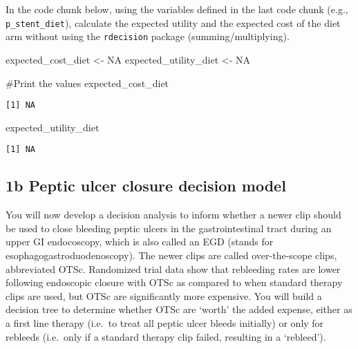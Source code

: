 \documentclass[
  letterpaper,
  DIV=11,
  numbers=noendperiod]{scrartcl}
\newenvironment{Shaded}{\begin{snugshade}}{\end{snugshade}}
\newcommand{\CommentTok}[1]{\textcolor[rgb]{0.37,0.37,0.37}{#1}}
\newcommand{\ConstantTok}[1]{\textcolor[rgb]{0.56,0.35,0.01}{#1}}
\newcommand{\NormalTok}[1]{\textcolor[rgb]{0.00,0.23,0.31}{#1}}
\newcommand{\OtherTok}[1]{\textcolor[rgb]{0.00,0.23,0.31}{#1}}
\begin{document}
In the code chunk below, using the variables defined in the last code
chunk (e.g., \texttt{p\_stent\_diet}), calculate the expected utility
and the expected cost of the diet arm without using the
\texttt{rdecision} package (summing/multiplying).

\begin{Shaded}
\begin{Highlighting}[]
\NormalTok{expected\_cost\_diet }\OtherTok{\textless{}{-}} \ConstantTok{NA}
\NormalTok{expected\_utility\_diet }\OtherTok{\textless{}{-}} \ConstantTok{NA}

\CommentTok{\#Print the values}
\NormalTok{expected\_cost\_diet}
\end{Highlighting}
\end{Shaded}

\begin{verbatim}
[1] NA
\end{verbatim}

\begin{Shaded}
\begin{Highlighting}[]
\NormalTok{expected\_utility\_diet}
\end{Highlighting}
\end{Shaded}

\begin{verbatim}
[1] NA
\end{verbatim}

\hypertarget{b-peptic-ulcer-closure-decision-model}{%
\subsection{1b Peptic ulcer closure decision
model}\label{b-peptic-ulcer-closure-decision-model}}

You will now develop a decision analysis to inform whether a newer clip
should be used to close bleeding peptic ulcers in the gastrointestinal
tract during an upper GI endocoscopy, which is also called an EGD
(stands for esophagogastroduodenoscopy). The newer clips are called
over-the-scope clips, abbreviated OTSc. Randomized trial data show that
rebleeding rates are lower following endoscopic closure with OTSc as
compared to when standard therapy clips are used, but OTSc are
significantly more expensive. You will build a decision tree to
determine whether OTSc are `worth' the added expense, either as a first
line therapy (i.e.~to treat all peptic ulcer bleeds initially) or only
for rebleeds (i.e.~only if a standard therapy clip failed, resulting in
a `rebleed').
\end{document}
